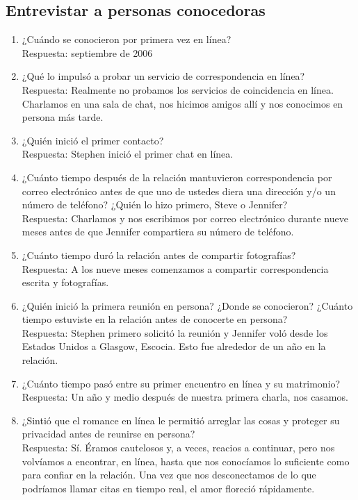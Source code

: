 \subsection{Entrevistar a personas conocedoras}
\begin{enumerate}[1.]
    \item ¿Cuándo se conocieron por primera vez en línea?\\
	Respuesta: septiembre de 2006 
    \item ¿Qué lo impulsó a probar un servicio de correspondencia en línea?\\
	Respuesta: Realmente no probamos los servicios de coincidencia en línea. Charlamos en una sala de chat, nos hicimos amigos allí y nos conocimos en persona más tarde. 
    \item ¿Quién inició el primer contacto?\\
	Respuesta: Stephen inició el primer chat en línea. 
    \item ¿Cuánto tiempo después de la relación mantuvieron correspondencia por correo electrónico antes de que uno de ustedes diera una dirección y/o un número de teléfono? ¿Quién lo hizo primero, Steve o Jennifer? \\
	Respuesta: Charlamos y nos escribimos por correo electrónico durante nueve meses antes de que Jennifer compartiera su número de teléfono.
    \item ¿Cuánto tiempo duró la relación antes de compartir fotografías?\\
	Respuesta: A los nueve meses comenzamos a compartir correspondencia escrita y fotografías. 
    \item ¿Quién inició la primera reunión en persona? ¿Donde se conocieron? ¿Cuánto tiempo estuviste en la relación antes de conocerte en persona?\\
	Respuesta: Stephen primero solicitó la reunión y Jennifer voló desde los Estados Unidos a Glasgow, Escocia. Esto fue alrededor de un año en la relación.
    \item ¿Cuánto tiempo pasó entre su primer encuentro en línea y su matrimonio?\\
	Respuesta: Un año y medio después de nuestra primera charla, nos casamos. 
    \item ¿Sintió que el romance en línea le permitió arreglar las cosas y proteger su privacidad antes de reunirse en persona?\\
	Respuesta: Sí. Éramos cautelosos y, a veces, reacios a continuar, pero nos volvíamos a encontrar, en línea, hasta que nos conocíamos lo suficiente como para confiar en la relación. Una vez que nos desconectamos de lo que podríamos llamar citas en tiempo real, el amor floreció rápidamente. 

\end{enumerate}

